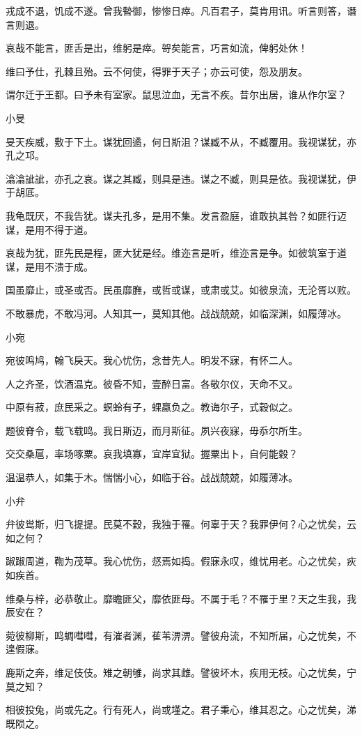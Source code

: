 戎成不退，饥成不遂。曾我暬御，惨惨日瘁。凡百君子，莫肯用讯。听言则答，谮言则退。

哀哉不能言，匪舌是出，维躬是瘁。哿矣能言，巧言如流，俾躬处休！

维曰予仕，孔棘且殆。云不何使，得罪于天子；亦云可使，怨及朋友。

谓尔迁于王都。曰予未有室家。鼠思泣血，无言不疾。昔尔出居，谁从作尔室？

小旻

旻天疾威，敷于下土。谋犹回遹，何日斯沮？谋臧不从，不臧覆用。我视谋犹，亦孔之邛。

潝潝訿訿，亦孔之哀。谋之其臧，则具是违。谋之不臧，则具是依。我视谋犹，伊于胡厎。

我龟既厌，不我告犹。谋夫孔多，是用不集。发言盈庭，谁敢执其咎？如匪行迈谋，是用不得于道。

哀哉为犹，匪先民是程，匪大犹是经。维迩言是听，维迩言是争。如彼筑室于道谋，是用不溃于成。

国虽靡止，或圣或否。民虽靡膴，或哲或谋，或肃或艾。如彼泉流，无沦胥以败。

不敢暴虎，不敢冯河。人知其一，莫知其他。战战兢兢，如临深渊，如履薄冰。

小宛

宛彼鸣鸠，翰飞戾天。我心忧伤，念昔先人。明发不寐，有怀二人。

人之齐圣，饮酒温克。彼昏不知，壹醉日富。各敬尔仪，天命不又。

中原有菽，庶民采之。螟蛉有子，蜾蠃负之。教诲尔子，式穀似之。

题彼脊令，载飞载鸣。我日斯迈，而月斯征。夙兴夜寐，毋忝尔所生。

交交桑扈，率场啄粟。哀我填寡，宜岸宜狱。握粟出卜，自何能穀？

温温恭人，如集于木。惴惴小心，如临于谷。战战兢兢，如履薄冰。

小弁

弁彼鸴斯，归飞提提。民莫不穀，我独于罹。何辜于天？我罪伊何？心之忧矣，云如之何？

踧踧周道，鞫为茂草。我心忧伤，惄焉如捣。假寐永叹，维忧用老。心之忧矣，疢如疾首。

维桑与梓，必恭敬止。靡瞻匪父，靡依匪母。不属于毛？不罹于里？天之生我，我辰安在？

菀彼柳斯，鸣蜩嘒嘒，有漼者渊，萑苇淠淠。譬彼舟流，不知所届，心之忧矣，不遑假寐。

鹿斯之奔，维足伎伎。雉之朝雊，尚求其雌。譬彼坏木，疾用无枝。心之忧矣，宁莫之知？

相彼投兔，尚或先之。行有死人，尚或墐之。君子秉心，维其忍之。心之忧矣，涕既陨之。

